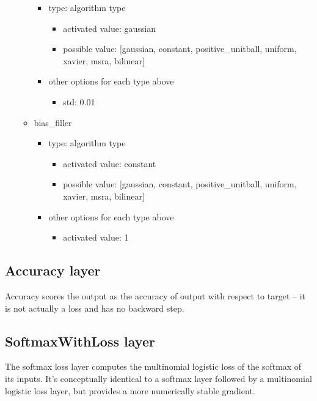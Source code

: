 \documentclass[11pt]{article}
\begin{document}
\begin{itemize}
\begin{itemize}
	\begin{itemize}
		\item type: algorithm type
		\begin{itemize}
			\item activated value: gaussian
			\item possible value: [gaussian, constant, positive\_unitball, uniform, xavier, msra, bilinear]
		\end{itemize}
		\item other options for each type above
		\begin{itemize}
			\item std: 0.01
		\end{itemize}
	\end{itemize}
	\item bias\_filler
	\begin{itemize}
		\item type: algorithm type
		\begin{itemize}
			\item activated value: constant
			\item possible value: [gaussian, constant, positive\_unitball, uniform, xavier, msra, bilinear]
		\end{itemize}
		\item other options for each type above
		\begin{itemize}
			\item activated value: 1
		\end{itemize}
	\end{itemize}
	\end{itemize}
\end{itemize}

\subsection{Accuracy layer}
Accuracy scores the output as the accuracy of output with respect to target – it is not actually a loss and has no backward step.

\subsection{SoftmaxWithLoss layer}
The softmax loss layer computes the multinomial logistic loss of the softmax of its inputs. It’s conceptually identical to a softmax layer followed by a multinomial logistic loss layer, but provides a more numerically stable gradient.



\end{document}
